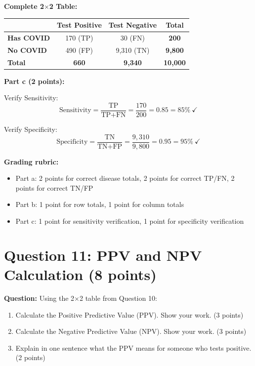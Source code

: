 \documentclass[11pt]{article}
\begin{document}
\textbf{Complete 2$\times$2 Table:}

\begin{center}
\begin{tabular}{lccc}
\toprule
 & \textbf{Test Positive} & \textbf{Test Negative} & \textbf{Total} \\
\midrule
\textbf{Has COVID} & 170 (TP) & 30 (FN) & \textbf{200} \\
\textbf{No COVID} & 490 (FP) & 9,310 (TN) & \textbf{9,800} \\
\midrule
\textbf{Total} & \textbf{660} & \textbf{9,340} & \textbf{10,000} \\
\bottomrule
\end{tabular}
\end{center}

\textbf{Part c (2 points):}

Verify Sensitivity:
\[\text{Sensitivity} = \frac{\text{TP}}{\text{TP} + \text{FN}} = \frac{170}{200} = 0.85 = 85\%~\checkmark\]

Verify Specificity:
\[\text{Specificity} = \frac{\text{TN}}{\text{TN} + \text{FP}} = \frac{9{,}310}{9{,}800} = 0.95 = 95\%~\checkmark\]

\textbf{Grading rubric:}
\begin{itemize}
    \item Part a: 2 points for correct disease totals, 2 points for correct TP/FN, 2 points for correct TN/FP
    \item Part b: 1 point for row totals, 1 point for column totals
    \item Part c: 1 point for sensitivity verification, 1 point for specificity verification
\end{itemize}

\vspace{0.3cm}
\noindent\hrulefill

\section*{Question 11: PPV and NPV Calculation (8 points)}

\textbf{Question:} Using the 2$\times$2 table from Question 10:

\begin{enumerate}
    \item[a)] Calculate the Positive Predictive Value (PPV). Show your work. (3 points)
    \item[b)] Calculate the Negative Predictive Value (NPV). Show your work. (3 points)
    \item[c)] Explain in one sentence what the PPV means for someone who tests positive. (2 points)
\end{enumerate}
\end{document}
